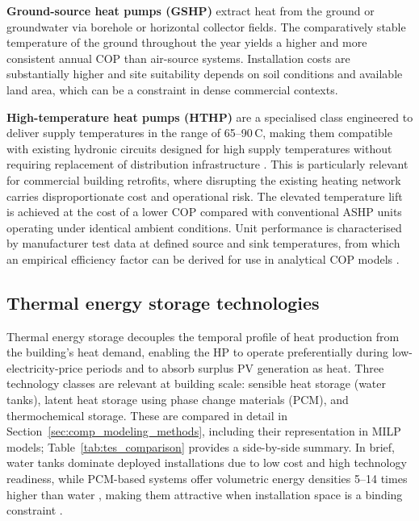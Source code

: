 \documentclass[11pt,a4paper]{report}
\begin{document}
\textbf{Ground-source heat pumps (GSHP)} extract heat from the ground or groundwater via borehole or horizontal collector fields.
The comparatively stable temperature of the ground throughout the year yields a higher and more consistent annual COP than air-source systems.
Installation costs are substantially higher and site suitability depends on soil conditions and available land area, which can be a constraint in dense commercial contexts.

\textbf{High-temperature heat pumps (HTHP)} are a specialised class engineered to deliver supply temperatures in the range of 65--90\,\textdegree C, making them compatible with existing hydronic circuits designed for high supply temperatures without requiring replacement of distribution infrastructure \cite{Krutzfeldt2021}.
This is particularly relevant for commercial building retrofits, where disrupting the existing heating network carries disproportionate cost and operational risk.
The elevated temperature lift is achieved at the cost of a lower COP compared with conventional ASHP units operating under identical ambient conditions.
Unit performance is characterised by manufacturer test data at defined source and sink temperatures, from which an empirical efficiency factor can be derived for use in analytical COP models \cite{Rogeau2024HPPL}.

\subsection{Thermal energy storage technologies}
\label{sub:lit_tes_overview}

Thermal energy storage decouples the temporal profile of heat production from the building's heat demand, enabling the HP to operate preferentially during low-electricity-price periods and to absorb surplus PV generation as heat.
Three technology classes are relevant at building scale: sensible heat storage (water tanks), latent heat storage using phase change materials (PCM), and thermochemical storage.
These are compared in detail in Section~\ref{sec:comp_modeling_methods}, including their representation in MILP models; Table~\ref{tab:tes_comparison} provides a side-by-side summary.
In brief, water tanks dominate deployed installations due to low cost and high technology readiness, while PCM-based systems offer volumetric energy densities 5--14 times higher than water \cite{Sharma2009}, making them attractive when installation space is a binding constraint \cite{Dincer2018}.
\end{document}
